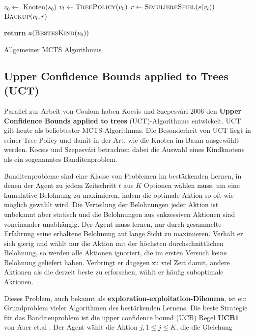 \begin{algorithm}[H]
\begin{algorithmic}
	\State $v_0\gets$ Knoten($s_0$)
		\State $v_l\gets \Call{TreePolicy}{v_0}$
		\State $r\gets \Call{SimuliereSpiel}{s(v_l)}$
		\State $\Call{Backup}{v_l, r}$
	\EndWhile

\State \textbf{return} $a(\Call{BestesKind}{v_0})$
\EndFunction
\end{algorithmic}
\caption{Allgemeiner MCTS Algorithmus\footnotemark}
\label{algo:mcts}
\end{algorithm}

\subsection{Upper Confidence Bounds applied to Trees (UCT)}
\label{chap:UCT}
Parallel zur Arbeit von Coulom haben Kocsis und Szepesv\'{a}ri 2006 den \textbf{Upper Confidence Bounds applied to trees} (UCT)-Algorithmus \autocite{kocsisBanditBasedMonteCarlo2006} entwickelt. UCT gilt heute als beliebtester MCTS-Algorithmus. Die Besonderheit von UCT liegt in seiner Tree Policy und damit in der Art, wie die Knoten im Baum ausgewählt werden. Kocsis und Szepesv\'{a}ri betrachten dabei die Auswahl eines Kindknotens als ein sogenanntes Banditenproblem. \autocite[\ppno~25\psqq]{suttonReinforcementLearningIntroduction2018}

\bigskip
Banditenprobleme sind eine Klasse von Problemen im bestärkenden Lernen, in denen der Agent zu jedem Zeitschritt $t$ aus $K$ Optionen wählen muss, um eine kumulative Belohnung zu maximieren, indem die optimale Aktion so oft wie möglich gewählt wird. Die Verteilung der Belohnungen jeder Aktion ist unbekannt aber statisch und die Belohnungen aus sukzessiven Aktionen sind voneinander unabhängig. Der Agent muss lernen, nur durch gesammelte Erfahrung seine erhaltene Belohnung auf lange Sicht zu maximieren. Verhält er sich gierig und wählt nur die Aktion mit der höchsten durchschnittlichen Belohnung, so werden alle Aktionen ignoriert, die im ersten Versuch keine Belohnung geliefert haben. Verbringt er dagegen zu viel Zeit damit, andere Aktionen als die derzeit beste zu erforschen, wählt er häufig suboptimale Aktionen. 

Dieses Problem, auch bekannt als \textbf{exploration-exploitation-Dilemma}, ist ein Grundproblem vieler Algorithmen des bestärkenden Lernens. Die beste Strategie für das Banditenproblem ist die upper confidence bound (UCB) Regel \textbf{UCB1} von Auer et.al \autocite[\ppno~237]{auerFinitetimeAnalysisMultiarmed2002}. Der Agent wählt die Aktion $j, 1 \le j \le K$, die die Gleichung

